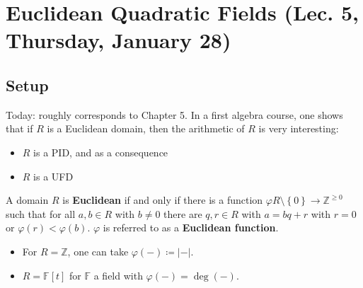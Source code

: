 \hypertarget{euclidean-quadratic-fields-lec.-5-thursday-january-28}{%
\section{Euclidean Quadratic Fields (Lec. 5, Thursday, January
28)}\label{euclidean-quadratic-fields-lec.-5-thursday-january-28}}

\hypertarget{setup}{%
\subsection{Setup}\label{setup}}

\begin{remark}

Today: roughly corresponds to Chapter 5. In a first algebra course, one
shows that if \(R\) is a Euclidean domain, then the arithmetic of \(R\)
is very interesting:

\begin{itemize}
\tightlist
\item
  \(R\) is a PID, and as a consequence
\item
  \(R\) is a UFD
\end{itemize}

\end{remark}

\begin{definition}

A domain \(R\) is \textbf{Euclidean} if and only if there is a function
\(\varphi R\setminus\left\{{0}\right\}\to {\mathbb{Z}}^{\geq 0}\) such
that for all \(a,b\in R\) with \(b\neq 0\) there are \(q, r\in R\) with
\(a = bq + r\) with \(r=0\) or \(\varphi(r) < \varphi(b)\). \(\varphi\)
is referred to as a \textbf{Euclidean function}.

\end{definition}

\begin{example}

\envlist

\begin{itemize}
\tightlist
\item
  For \(R={\mathbb{Z}}\), one can take
  \(\varphi({-}) \coloneqq{\left\lvert {{-}} \right\rvert}\).
\item
  \(R = {\mathbb{F}}[t]\) for \({\mathbb{F}}\) a field with
  \(\varphi({-}) = \deg({-})\).
\end{itemize}

\end{example}

